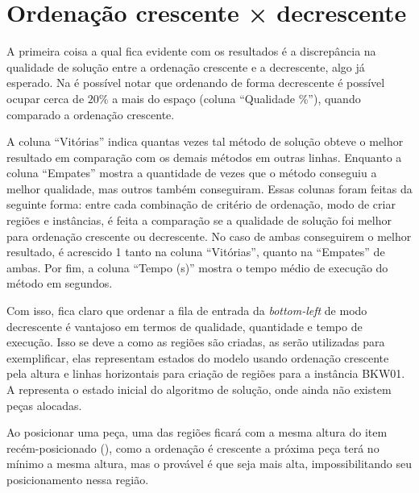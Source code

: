 \section{Ordenação crescente × decrescente}\label{sec:ordenacao-crescente-decrescente}

A primeira coisa a qual fica evidente com os resultados é a discrepância na qualidade de solução
entre a ordenação crescente e a decrescente, algo já esperado.
Na  é possível notar que ordenando de forma decrescente é possível ocupar
cerca de $20\%$ a mais do espaço (coluna “Qualidade \%”), quando comparado a ordenação crescente.



A coluna “Vitórias” indica quantas vezes tal método de solução obteve o melhor resultado em
comparação com os demais métodos em outras linhas.
Enquanto a coluna “Empates” mostra a quantidade de vezes que o método conseguiu a melhor qualidade,
mas outros também conseguiram.
Essas colunas foram feitas da seguinte forma: entre cada combinação de critério de ordenação,
modo de criar regiões e instâncias, é feita a comparação se a qualidade de solução foi melhor
para ordenação crescente ou decrescente.
No caso de ambas conseguirem o melhor resultado, é acrescido 1 tanto na coluna “Vitórias”, quanto
na “Empates” de ambas.
Por fim, a coluna “Tempo (s)” mostra o tempo médio de execução do método em segundos.

Com isso, fica claro que ordenar a fila de entrada da \textit{bottom-left} de modo decrescente é
vantajoso em termos de qualidade, quantidade e tempo de execução.
Isso se deve a como as regiões são criadas,
as  serão utilizadas para exemplificar,
elas representam estados do modelo usando ordenação crescente pela altura e linhas horizontais
para criação de regiões para a instância BKW01.
A  representa o estado inicial do algoritmo de solução, onde ainda
não existem peças alocadas.



Ao posicionar uma peça, uma das regiões ficará com a mesma altura do item recém-posicionado
(), como a ordenação é crescente a próxima peça terá no mínimo a mesma altura,
mas o provável é que seja mais alta, impossibilitando seu posicionamento nessa região.

